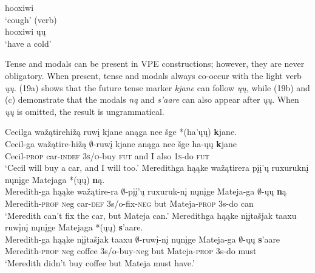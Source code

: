 \documentclass[output=paper]{LSP/langsci}
\begin{document}
\pagebreak
\begin{exe}
\ex
\begin{multicols}{2}
\begin{xlist}
\ex
hooxiwi\\
`cough' (verb)\\

\ex
hooxiwi ųų\\
`have a cold'
\end{xlist}
\end{multicols}
\end{exe}

Tense and modals can be present in VPE constructions; however, they are never obligatory. When present, tense and modals always co-occur with the light verb \emph{ųų}. (19a) shows that the future tense marker \emph{kjane} can follow \emph{ųų}, while (19b) and (c) demonstrate that the modals \emph{ną} and \emph{s'aare} can also appear after \emph{ųų}. When \emph{ųų} is omitted, the result is ungrammatical.

\begin{exe}
\ex
\begin{xlist}
\ex
\glll Cecilga wažątirehižą ruwį kjane anąga nee šge *(ha'ųų) {\textbf kjane}.\\
Cecil-ga wažątire-hižą $\emptyset$-ruwį kjane anąga nee šge ha-ųų {\textbf kjane}\\
Cecil-\textsc{prop} car-\textsc{indef} \textsc{3s/o}-buy \textsc{fut} and I also \textsc{1s}-do \textsc{fut}\\
\trans `Cecil will buy a car, and I will too.' 
\ex
\glll Meredithga hąąke wažątirera {pįį'ų ruxuruknį} nųnįge Matejaga *(ųų) {\textbf ną}.\\
Meredith-ga hąąke wažątire-ra {$\emptyset$-pįį'ų ruxuruk-nį} nųnįge Mateja-ga $\emptyset$-ųų {\textbf ną}\\
Meredith-\textsc{prop} {\textsc neg} car-\textsc{def} {\textsc 3s/o}-fix-\textsc{neg} but Mateja-\textsc{prop} {\textsc 3s}-do can\\
\trans `Meredith can't fix the car, but Mateja can.'
\ex
\glll Meredithga hąąke {nįįtašjak taaxu} ruwįnį nųnįge Matejaga *(ųų) {\textbf s'aare}.\\ 
Meredith-ga hąąke {nįįtašjak taaxu} $\emptyset$-ruwį-nį nųnįge Mateja-ga $\emptyset$-ųų {\textbf s'aare}\\
Meredith-\textsc{prop} {\textsc neg} coffee {\textsc 3s/o}-buy-{\textsc neg} but Mateja-\textsc{prop} {\textsc 3s}-do must\\
\trans `Meredith didn't buy coffee but Mateja must have.' 
\end{xlist}
\end{exe}
\end{document}

